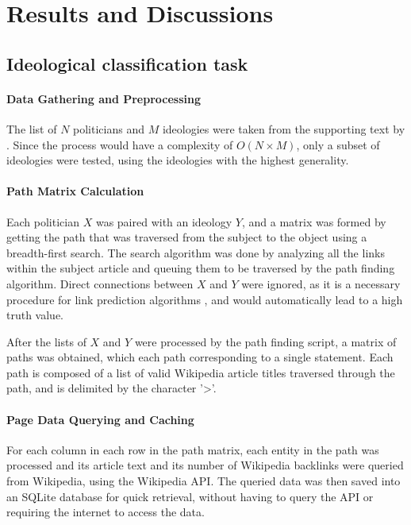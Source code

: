 \documentclass[10pt,11pt,12pt,oneside]{book}
\begin{document}
\chapter{Results and Discussions}

\section{Ideological classification task}

\subsubsection{Data Gathering and Preprocessing}

The list of $ N $ politicians and $ M $ ideologies were taken from the supporting text by \cite{ciampaglia2015computational}. Since the process would have a complexity of $ O(N \times M) $, only a subset of ideologies were tested, using the ideologies with the highest generality. 

\subsubsection{Path Matrix Calculation}
Each politician $ X $ was paired with an ideology $ Y $, and a matrix was formed by getting the path that was traversed from the subject to the object using a breadth-first search. The search algorithm was done by analyzing all the links within the subject article and queuing them to be traversed by the path finding algorithm. Direct connections between $ X $ and $ Y $ were ignored, as it is a necessary procedure for link prediction algorithms  \cite{liben-nowell_kleinberg_2007}, and would automatically lead to a high truth value. 

After the lists of $ X $ and $ Y $ were processed by the path finding script, a matrix of paths was obtained, which each path corresponding to a single statement. Each path is composed of a list of valid Wikipedia article titles traversed through the path, and is delimited by the character '>'.

\subsubsection{Page Data Querying and Caching}
For each column in each row in the path matrix, each entity in the path was processed and its article text and its number of Wikipedia backlinks were queried from Wikipedia, using the Wikipedia API. The queried data was then saved into an SQLite database for quick retrieval, without having to query the API or requiring the internet to access the data.
\end{document}
